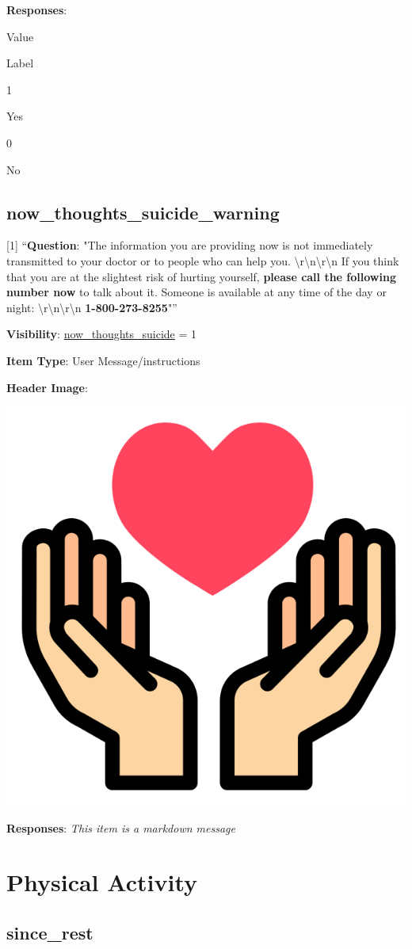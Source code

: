 \documentclass[]{book}
\begin{document}
\textbf{Responses}:

Value

Label

1

Yes

0

No

\hypertarget{now_thoughts_suicide_warning}{%
\section{now\_thoughts\_suicide\_warning}\label{now_thoughts_suicide_warning}}

{[}1{]} ``\textbf{Question}: "The information you are providing now is not immediately transmitted to your doctor or to people who can help you. \textbackslash{}r\textbackslash{}n\textbackslash{}r\textbackslash{}n If you think that you are at the slightest risk of hurting yourself, \textbf{please call the following number now} to talk about it. Someone is available at any time of the day or night: \textbackslash{}r\textbackslash{}n\textbackslash{}r\textbackslash{}n \textbf{1-800-273-8255}"''

\textbf{Visibility}: \protect\hyperlink{now_thoughts_suicide}{now\_thoughts\_suicide} = 1

\textbf{Item Type}: User Message/instructions

\textbf{Header Image}:

\begin{flushleft}\includegraphics[width=0.33\linewidth]{downloadFigs4latex_NIMH_Applet_Codebook/now_thoughts_suicide_warning_headerImg} \end{flushleft}

\textbf{Responses}: \emph{This item is a markdown message}

\hypertarget{activity_section}{%
\chapter{Physical Activity}\label{activity_section}}

\hypertarget{since_rest}{%
\section{since\_rest}\label{since_rest}}
\end{document}
